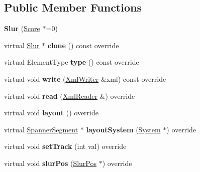 \subsection*{Public Member Functions}
\begin{DoxyCompactItemize}
\item 
\mbox{\label{class_ms_1_1_slur_ac42c6bba542234edcc84825e5a27a36f}} 
{\bfseries Slur} (\hyperlink{class_ms_1_1_score}{Score} $\ast$=0)
\item 
\mbox{\label{class_ms_1_1_slur_abd01c7a4f72342da82e3ddf1c5487248}} 
virtual \hyperlink{class_ms_1_1_slur}{Slur} $\ast$ {\bfseries clone} () const override
\item 
\mbox{\label{class_ms_1_1_slur_ab80ed42953732bb32fa2aec277509de6}} 
virtual Element\+Type {\bfseries type} () const override
\item 
\mbox{\label{class_ms_1_1_slur_afcf1e6d143b8722ca2b168da3eff104f}} 
virtual void {\bfseries write} (\hyperlink{class_ms_1_1_xml_writer}{Xml\+Writer} \&xml) const override
\item 
\mbox{\label{class_ms_1_1_slur_a71856e60f007bbb46e0c18057e41ee28}} 
virtual void {\bfseries read} (\hyperlink{class_ms_1_1_xml_reader}{Xml\+Reader} \&) override
\item 
\mbox{\label{class_ms_1_1_slur_ada9910ef27a17940838e795f65d70e12}} 
virtual void {\bfseries layout} () override
\item 
\mbox{\label{class_ms_1_1_slur_a7aaa959bd6b6432bdca188771dfb97e4}} 
virtual \hyperlink{class_ms_1_1_spanner_segment}{Spanner\+Segment} $\ast$ {\bfseries layout\+System} (\hyperlink{class_ms_1_1_system}{System} $\ast$) override
\item 
\mbox{\label{class_ms_1_1_slur_ae358b25c537dd8a8ccb95366a9d30272}} 
virtual void {\bfseries set\+Track} (int val) override
\item 
\mbox{\label{class_ms_1_1_slur_a54051e5a70ec6b36786d030d1bce83f2}} 
virtual void {\bfseries slur\+Pos} (\hyperlink{struct_ms_1_1_slur_pos}{Slur\+Pos} $\ast$) override

\end{DoxyCompactItemize}
